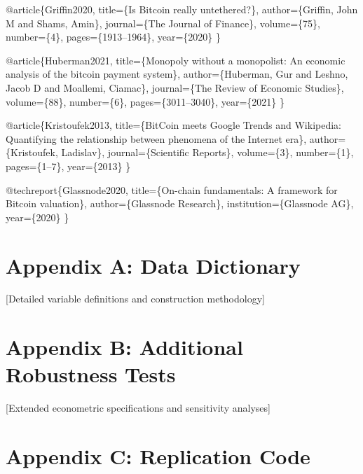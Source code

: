 \documentclass[
  12pt,
  letterpaper,
  DIV=11,
  numbers=noendperiod]{scrartcl}
\begin{document}
@article\{Griffin2020, title=\{Is Bitcoin really untethered?\},
author=\{Griffin, John M and Shams, Amin\}, journal=\{The Journal of
Finance\}, volume=\{75\}, number=\{4\}, pages=\{1913--1964\},
year=\{2020\} \}

@article\{Huberman2021, title=\{Monopoly without a monopolist: An
economic analysis of the bitcoin payment system\}, author=\{Huberman,
Gur and Leshno, Jacob D and Moallemi, Ciamac\}, journal=\{The Review of
Economic Studies\}, volume=\{88\}, number=\{6\}, pages=\{3011--3040\},
year=\{2021\} \}

@article\{Kristoufek2013, title=\{BitCoin meets Google Trends and
Wikipedia: Quantifying the relationship between phenomena of the
Internet era\}, author=\{Kristoufek, Ladislav\}, journal=\{Scientific
Reports\}, volume=\{3\}, number=\{1\}, pages=\{1--7\}, year=\{2013\} \}

@techreport\{Glassnode2020, title=\{On-chain fundamentals: A framework
for Bitcoin valuation\}, author=\{Glassnode Research\},
institution=\{Glassnode AG\}, year=\{2020\} \}

\section{Appendix A: Data Dictionary}\label{appendix-a-data-dictionary}

{[}Detailed variable definitions and construction methodology{]}

\section{Appendix B: Additional Robustness
Tests}\label{appendix-b-additional-robustness-tests}

{[}Extended econometric specifications and sensitivity analyses{]}

\section{Appendix C: Replication
Code}\label{appendix-c-replication-code}
\end{document}
